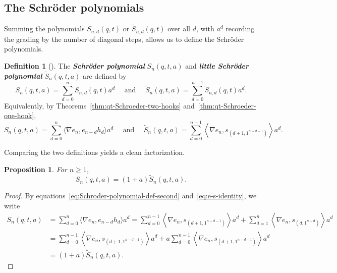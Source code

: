 \documentclass[11pt, noadjust, reqno]{amsart}
\newtheorem{proposition}[theorem]{Proposition}
\theoremstyle{definition}
\newtheorem{definition}[theorem]{Definition}
\theoremstyle{remark}
\numberwithin{equation}{section}
\newcommand{\0}{\emptyset}
\newcommand{\newword}[1]{\emph{\textbf{#1}}}
\begin{document}
\subsection{The Schr\"oder polynomials}
Summing the polynomials $S_{n,d}(q,t)$ or $\widetilde{S}_{n,d}(q,t)$  over all $d$, with $a^d$ recording the grading by the number of diagonal steps, allows us to define the Schr\"oder polynomials.
\begin{definition}[{\cite[Chapter 4]{Haglund2008}}]
    The \newword{Schr\"oder polynomial} $S_n(q,t,a)$ and \newword{little Schr\"oder polynomial} $\widetilde{S}_n(q,t,a)$ are defined by
    \begin{equation}\label{eq:Schroder-polynomial-def}
    S_n(q,t,a) = \sum_{d=0}^n S_{n,d}(q,t) a^d \quad \text{ and } \quad
    \widetilde{S}_n(q,t,a) = \sum_{d=0}^{n-1} \widetilde{S}_{n,d}(q,t) a^d.
    \end{equation}
Equivalently, by Theorems~\ref{thm:qt-Schroeder-two-hooks} and~\ref{thm:qt-Schroeder-one-hook},
    \begin{equation}\label{eq:Schroder-polynomial-def-second}
    S_n(q,t,a) = \sum_{d=0}^n \Big\langle \nabla e_n, e_{n-d} h_d \Big\rangle a^d \quad \text{ and } \quad
    \widetilde{S}_n(q,t,a) =
    \sum_{d=0}^{n-1} \left\langle \nabla e_n, s_{(d+1,1^{n-d-1})}  \right\rangle a^d.
    \end{equation}
\end{definition}

Comparing the two definitions yields a clean factorization.
\begin{proposition}\label{prop:BigSmall-Schroder}
For $n \geq 1$,
    \begin{equation*}
S_n(q,t,a) = (1+a)\widetilde{S}_{n}(q,t,a).
    \end{equation*}
\end{proposition}

\begin{proof}
By equations~\eqref{eq:Schroder-polynomial-def-second} and~\eqref{eq:e-s-identity}, we write
    \begin{align*}
S_n(q,t,a) &= \sum_{d=0}^n \Big\langle \nabla e_n, e_{n-d} h_d \Big\rangle a^d
= \sum_{d=0}^{n-1} \left\langle \nabla e_n, s_{(d+1,1^{n-d-1})} \right\rangle a^d +
\sum_{d=1}^n \left\langle \nabla e_n, s_{(d,1^{n-d})}\right\rangle a^d
\\
&= \sum_{d=0}^{n-1} \left\langle \nabla e_n, s_{(d+1,1^{n-d-1})} \right\rangle a^d +
a \sum_{d=0}^{n-1} \left\langle \nabla e_n, s_{(d+1,1^{n-d-1})}\right\rangle a^{d}
\\
&= (1+a) \widetilde{S}_n(q,t,a).
    \end{align*}
\end{proof}
\end{document}

